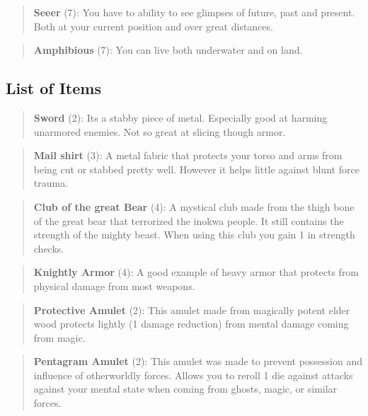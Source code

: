 \documentclass[11pt]{article}
\begin{document}
{\begin{quote}
\textbf{Seeer} (7): You have to ability to see glimpses of future, past and present. Both at your current position and over great distances. 
\end{quote}

\begin{quote}
\textbf{Amphibious} (7): You can live both underwater and on land.
\end{quote}


\subsection{List of Items}
\label{sec:org1c0fa02}
\begin{quote}
\textbf{Sword} (2): Its a stabby piece of metal. Especially good at harming unarmored enemies. Not so great at slicing though armor. 
\end{quote}

\begin{quote}
\textbf{Mail shirt} (3): A metal fabric that protects your torso and arms from being cut or stabbed pretty well. However it helps little against blunt force trauma.
\end{quote}

\begin{quote}
\textbf{Club of the great Bear} (4): A mystical club made from the thigh bone of the great bear that terrorized the inokwa people. It still contains the strength of the mighty beast. When using this club you gain 1 in strength checks.
\end{quote}

\begin{quote}
\textbf{Knightly Armor} (4): A good example of heavy armor that protects from physical damage from most weapons.
\end{quote}

\begin{quote}
\textbf{Protective Amulet} (2): This amulet made from magically potent elder wood protects lightly (1 damage reduction) from mental damage coming from magic.
\end{quote}

\begin{quote}
\textbf{Pentagram Amulet} (2): This amulet was made to prevent possession and influence of otherworldly forces. Allows you to reroll 1 die against attacks against your mental state when coming from ghosts, magic, or similar forces.
\end{quote}

}
\end{document}
